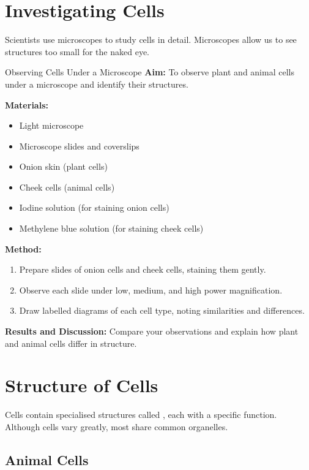 \section{Investigating Cells}

Scientists use microscopes to study cells in detail. Microscopes allow us to see structures too small for the naked eye.

\begin{investigation}{Observing Cells Under a Microscope}
\textbf{Aim:} To observe plant and animal cells under a microscope and identify their structures.

\textbf{Materials:}
\begin{itemize}
\item Light microscope
\item Microscope slides and coverslips
\item Onion skin (plant cells)
\item Cheek cells (animal cells)
\item Iodine solution (for staining onion cells)
\item Methylene blue solution (for staining cheek cells)
\end{itemize}

\textbf{Method:}
\begin{enumerate}
\item Prepare slides of onion cells and cheek cells, staining them gently.
\item Observe each slide under low, medium, and high power magnification.
\item Draw labelled diagrams of each cell type, noting similarities and differences.
\end{enumerate}

\textbf{Results and Discussion:}
Compare your observations and explain how plant and animal cells differ in structure.
\end{investigation}

\section{Structure of Cells}

Cells contain specialised structures called , each with a specific function. Although cells vary greatly, most share common organelles.

\subsection{Animal Cells}

